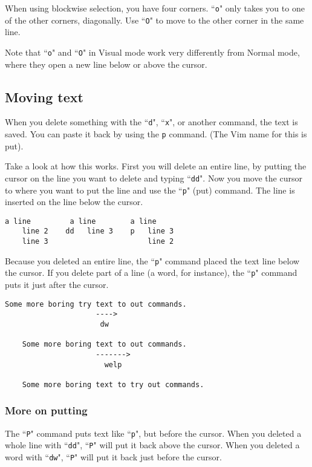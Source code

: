 When using blockwise selection, you have four corners.
``\texttt{o}" only takes you to one of the other corners, diagonally.
Use ``\texttt{O}" to move to the other corner in the same line.

Note that ``\texttt{o}" and ``\texttt{O}" in Visual mode work very differently from Normal mode, where they open a new line below or above the cursor.

\subsection{Moving text}

When you delete something with the ``\texttt{d}", ``\texttt{x}", or another command, the text is saved.
You can paste it back by using the \texttt{p} command.
(The Vim name for this is put).

Take a look at how this works.
First you will delete an entire line, by putting the cursor on the line you want to delete and typing ``\texttt{dd}".
Now you move the cursor to where you want to put the line and use the ``\texttt{p}" (put) command.
The line is inserted on the line below the cursor.

\begin{Verbatim}[samepage=true]
    a line         a line        a line
    line 2    dd   line 3    p   line 3
    line 3                       line 2
\end{Verbatim}

Because you deleted an entire line, the ``\texttt{p}" command placed the text line below the cursor.
If you delete part of a line (a word, for instance), the ``\texttt{p}" command puts it just after the cursor.

\begin{Verbatim}[samepage=true]
    Some more boring try text to out commands.
                     ---->
                      dw

    Some more boring text to out commands.
                     ------->
                       welp

    Some more boring text to try out commands.
\end{Verbatim}

\subsubsection{More on putting}

The ``\texttt{P}" command puts text like ``\texttt{p}", but before the cursor.
When you deleted a whole line with ``\texttt{dd}", ``\texttt{P}" will put it back above the cursor.
When you deleted a word with ``\texttt{dw}", ``\texttt{P}" will put it back just before the cursor.

